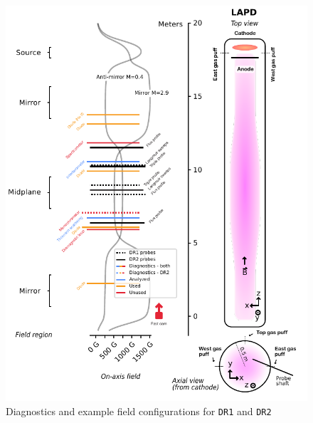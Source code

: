 \begin{figure}
	\centering
	\includegraphics[width=450pt]{figures/lapd-diagnostics.pdf}
	\caption[LAPD configuration and diagnostics for the ML datarun]{\label{fig:ml-lapd-diagnostics}Diagnostics and example field configurations for \texttt{DR1} and \texttt{DR2}}
\end{figure}

